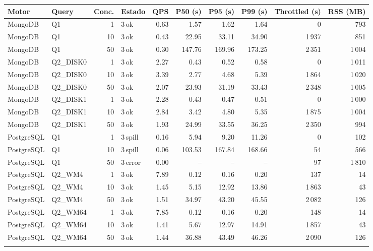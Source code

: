 \begin{tabular}{llrlrrrrrr}
\toprule
Motor & Query & Conc. & Estado & QPS & P50 (s) & P95 (s) & P99 (s) & Throttled (s) & RSS (MB) \\
\midrule
MongoDB & Q1 & 1 & 3\,ok & 0.63 & 1.57 & 1.62 & 1.64 & 0 & 793 \\
MongoDB & Q1 & 10 & 3\,ok & 0.43 & 22.95 & 33.11 & 34.90 & 1\,937 & 851 \\
MongoDB & Q1 & 50 & 3\,ok & 0.30 & 147.76 & 169.96 & 173.25 & 2\,351 & 1\,004 \\
\addlinespace[2pt]
MongoDB & Q2\_DISK0 & 1 & 3\,ok & 2.27 & 0.43 & 0.52 & 0.58 & 0 & 1\,011 \\
MongoDB & Q2\_DISK0 & 10 & 3\,ok & 3.39 & 2.77 & 4.68 & 5.39 & 1\,864 & 1\,020 \\
MongoDB & Q2\_DISK0 & 50 & 3\,ok & 2.07 & 23.93 & 31.19 & 33.43 & 2\,348 & 1\,005 \\
\addlinespace[2pt]
MongoDB & Q2\_DISK1 & 1 & 3\,ok & 2.28 & 0.43 & 0.47 & 0.51 & 0 & 1\,000 \\
MongoDB & Q2\_DISK1 & 10 & 3\,ok & 2.84 & 3.42 & 4.80 & 5.35 & 1\,875 & 1\,004 \\
MongoDB & Q2\_DISK1 & 50 & 3\,ok & 1.93 & 24.99 & 33.55 & 36.25 & 2\,350 & 994 \\
\addlinespace[2pt]
\midrule
PostgreSQL & Q1 & 1 & 3\,spill & 0.16 & 5.94 & 9.20 & 11.26 & 0 & 102 \\
PostgreSQL & Q1 & 10 & 3\,spill & 0.06 & 103.53 & 167.84 & 168.66 & 54 & 566 \\
PostgreSQL & Q1 & 50 & 3\,error & 0.00 & -- & -- & -- & 97 & 1\,810 \\
\addlinespace[2pt]
PostgreSQL & Q2\_WM4 & 1 & 3\,ok & 7.89 & 0.12 & 0.16 & 0.20 & 137 & 14 \\
PostgreSQL & Q2\_WM4 & 10 & 3\,ok & 1.45 & 5.15 & 12.92 & 13.86 & 1\,863 & 43 \\
PostgreSQL & Q2\_WM4 & 50 & 3\,ok & 1.51 & 34.97 & 43.20 & 45.55 & 2\,082 & 126 \\
\addlinespace[2pt]
PostgreSQL & Q2\_WM64 & 1 & 3\,ok & 7.85 & 0.12 & 0.16 & 0.20 & 148 & 14 \\
PostgreSQL & Q2\_WM64 & 10 & 3\,ok & 1.41 & 5.67 & 12.97 & 14.91 & 1\,857 & 43 \\
PostgreSQL & Q2\_WM64 & 50 & 3\,ok & 1.44 & 36.88 & 43.49 & 46.26 & 2\,090 & 126 \\
\addlinespace[2pt]
\bottomrule
\end{tabular}
